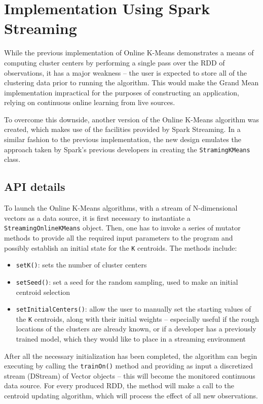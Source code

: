\documentclass{l4proj}
\begin{document}
\section{Implementation Using Spark Streaming}

While the previous implementation of Online K-Means demonstrates a means of computing cluster centers by performing a single pass over the RDD of observations, it has a major weakness -- the user is expected to store all of the clustering data  prior to running the algorithm. This would make the Grand Mean implementation impractical for the purposes of constructing an application, relying on continuous online learning from live sources. 

To overcome this downside, another version of the Online K-Means algorithm was created, which makes use of the facilities provided by Spark Streaming. In a similar fashion to the previous implementation, the new design emulates the approach taken by Spark's previous developers in creating the \texttt{StramingKMeans} class.

\subsection{API details}

To launch the Online K-Means algorithms, with a stream of N-dimensional vectors as a data source, it is first necessary to instantiate a \texttt{StreamingOnlineKMeans} object. Then, one has to invoke a series of mutator methods to provide all the required input parameters to the program and possibly establish an initial state for the \texttt{K} centroids. The methods include:

\begin{itemize}
\item \texttt{setK()}: sets the number of cluster centers
\item \texttt{setSeed()}: set a seed for the random sampling, used to make an initial centroid selection
\item \texttt{setInitialCenters()}: allow the user to manually set the starting values of the \texttt{K} centroids, along with their initial weights -- especially useful if the rough locations of the clusters are already known, or if a developer has a previously trained model, which they would like to place in a streaming environment 
\end{itemize}

After all the necessary initialization has been completed, the algorithm can begin executing by calling the \texttt{trainOn()} method and providing as input a discretized stream (DStream) of Vector objects -- this will become the monitored continuous data source. For every produced RDD, the method will make a call to the centroid updating algorithm, which will process the effect of all new observations. 
\end{document}
